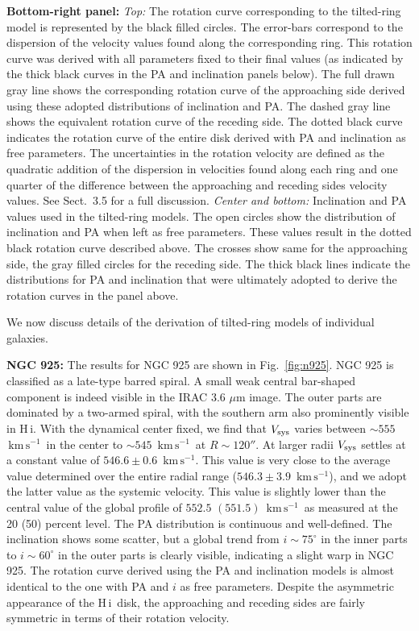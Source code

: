 \documentclass[usenatbib,usegraphicx,apjfonts,floatfix]{emulateapj}
\newcommand{\kms}{\ensuremath{\,\mbox{km}\,\mbox{s}^{-1}}}
\newcommand{\HI}{H\,{\sc i}}
\begin{document}
{\bf Bottom-right panel:} \emph{Top:} The rotation curve corresponding
to the tilted-ring model is represented by the black filled
circles. The error-bars correspond to the dispersion of the velocity
values found along the corresponding ring. This rotation curve was
derived with all parameters fixed to their final values (as indicated
by the thick black curves in the PA and inclination panels below). The
full drawn gray line shows the corresponding rotation curve of the
approaching side derived using these adopted distributions of
inclination and PA. The dashed gray line shows the equivalent rotation
curve of the receding side. The dotted black curve indicates the
rotation curve of the entire disk derived with PA and inclination as
free parameters. The uncertainties in the rotation velocity are
defined as the quadratic addition of the dispersion in velocities
found along each ring and one quarter of the difference between the
approaching and receding sides velocity values. See Sect.~3.5 for a
full discussion.
 \emph{Center and bottom:} Inclination and PA values
used in the tilted-ring models. The open circles show the distribution
of inclination and PA when left as free parameters.  These values
result in the dotted black rotation curve described above.  The
crosses show same for the approaching side, the gray filled circles
for the receding side.  The thick black lines indicate the
distributions for PA and inclination that were ultimately adopted to
derive the rotation curves in the panel above.

We now discuss details of the derivation of tilted-ring models of
individual galaxies.

{\bf NGC 925:} The results for NGC 925 are shown in
Fig.~\ref{fig:n925}.  NGC 925 is classified as a late-type barred
spiral.  A small weak central bar-shaped component is indeed visible
in the IRAC 3.6 $\mu$m image. The outer parts are dominated by a
two-armed spiral, with the southern arm also prominently visible in
\HI.
With the dynamical center fixed, we find that $V_{\rm sys}$ varies
between $\sim 555$ \kms\ in the center to $\sim 545$ \kms\ at $R\sim
120''$. At larger radii $V_{\rm sys}$ settles at a constant value of
$546.6 \pm 0.6$ \kms. This value is very close to the average value
determined over the entire radial range ($546.3 \pm 3.9$ \kms), and we
adopt the latter value as the systemic velocity. This value is slightly
lower than the central value of the global profile of $552.5$
$(551.5)$ \kms\ as measured at the 20 (50) percent level.
The PA distribution is continuous and well-defined. The inclination
shows some scatter, but a global trend from $i \sim 75^{\circ}$ in the
inner parts to $i \sim 60^{\circ}$ in the outer parts is clearly
visible, indicating a slight warp in NGC 925.
The rotation curve derived using the PA and inclination models is
almost identical to the one with PA and $i$ as free parameters.
Despite the asymmetric appearance of the \HI\ disk, the approaching
and receding sides are fairly symmetric in terms of their rotation
velocity.
\end{document}
